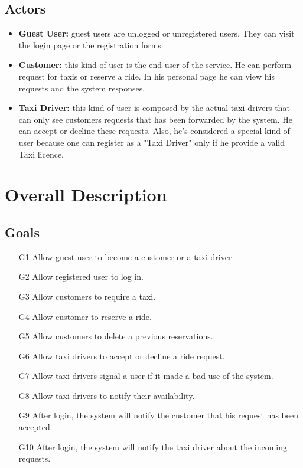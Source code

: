 \documentclass{report}
\begin{document}
	\section{Actors}
		\begin{itemize}
		  \item \textbf{Guest User:}\label{sec:normaluser} guest users are unlogged or unregistered users. They can visit the login page or the registration forms.

		  \item \textbf{Customer:}\label{sec:customer} this kind of user is the end-user of the service. He can perform request for taxis or reserve a ride. In his personal page he can view his requests and the system responses.

		  \item \textbf{Taxi Driver:}\label{sec:tdriver} this kind of user is composed by the actual taxi drivers that can only see customers requests that has been forwarded by the system. He can accept or decline these requests. Also, he's considered a special kind of user because one can register as a "Taxi Driver" only if he provide a valid Taxi licence.
		\end{itemize}
\chapter{Overall Description}
	\section{Goals}
		\begin{itemize}
		\item [G1]Allow guest user to become a customer or a taxi driver.

		\item [G2] Allow registered user to log in.

		\item [G3] Allow customers to require a taxi.

		\item [G4] Allow customer to reserve a ride.

		\item [G5] Allow customers to delete a previous reservations.

		\item [G6] Allow taxi drivers to accept or decline a ride request.

		\item [G7] Allow taxi drivers signal a user if it made a bad use of the system.

		\item [G8] Allow taxi drivers to notify their availability.

		\item [G9] After login, the system will notify the customer that his request has been accepted.

		\item [G10] After login, the system will notify the taxi driver about the incoming requests.
		\end{itemize}
\end{document}
